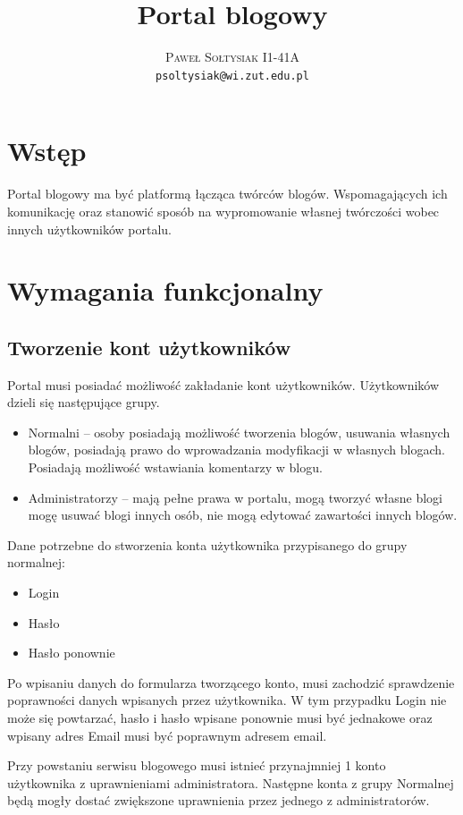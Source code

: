 \documentclass{article}
\title{Portal blogowy}
\author{\textsc{Paweł Sołtysiak I1-41A} \\ \texttt{psoltysiak@wi.zut.edu.pl}}
\begin{document}
\maketitle
\tableofcontents
\section{Wstęp}
Portal blogowy ma być platformą łącząca twórców blogów. Wspomagających ich komunikację oraz stanowić sposób na wypromowanie własnej twórczości wobec innych użytkowników portalu.



\section{Wymagania funkcjonalny}
\subsection{Tworzenie kont użytkowników}
Portal musi posiadać możliwość zakładanie kont użytkowników. Użytkowników dzieli się następujące grupy.
\begin{itemize}
\item Normalni -- osoby posiadają możliwość tworzenia blogów, usuwania własnych blogów, posiadają prawo do wprowadzania modyfikacji w własnych blogach. Posiadają możliwość wstawiania komentarzy w blogu.
\item Administratorzy -- mają pełne prawa w portalu, mogą tworzyć własne blogi mogę usuwać blogi innych osób, nie mogą edytować zawartości innych blogów.
\end{itemize}

Dane potrzebne do stworzenia konta użytkownika przypisanego do grupy normalnej:
\begin{itemize}
\item Login
\item Hasło
\item Hasło ponownie
\end{itemize}

Po wpisaniu danych do formularza tworzącego konto, musi zachodzić sprawdzenie poprawności danych wpisanych przez użytkownika. W tym przypadku Login nie może się powtarzać, hasło i hasło wpisane ponownie musi być jednakowe oraz wpisany adres Email musi być poprawnym adresem email.

Przy powstaniu serwisu blogowego musi istnieć przynajmniej 1 konto użytkownika z uprawnieniami administratora. Następne konta z grupy Normalnej będą mogły dostać zwiększone uprawnienia przez jednego z administratorów.
\end{document}

